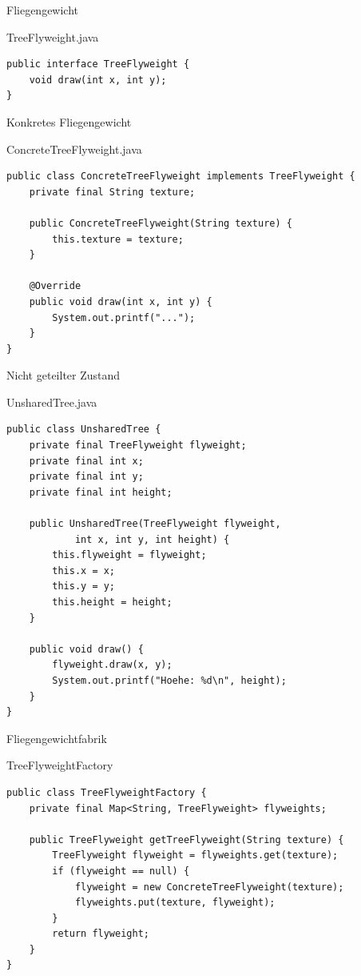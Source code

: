 \begin{frame}[fragile]{Fliegengewicht}
	\begin{exampleblock}{TreeFlyweight.java}
 		\begin{lstlisting}
public interface TreeFlyweight {
    void draw(int x, int y);
}
 		\end{lstlisting}
 	\end{exampleblock}
\end{frame}

\begin{frame}[fragile]{Konkretes Fliegengewicht}
	\begin{exampleblock}{ConcreteTreeFlyweight.java}
 		\begin{lstlisting}
public class ConcreteTreeFlyweight implements TreeFlyweight {
	private final String texture;

	public ConcreteTreeFlyweight(String texture) {
		this.texture = texture;
	}

	@Override
	public void draw(int x, int y) {
		System.out.printf("...");
	}
}
 		\end{lstlisting}
 	\end{exampleblock}
\end{frame}

\begin{frame}[fragile]{Nicht geteilter Zustand}
	\begin{exampleblock}{UnsharedTree.java}
 		\begin{lstlisting}
public class UnsharedTree {
	private final TreeFlyweight flyweight;
	private final int x;
	private final int y;
	private final int height;

	public UnsharedTree(TreeFlyweight flyweight, 
            int x, int y, int height) {
		this.flyweight = flyweight;
		this.x = x;
		this.y = y;
		this.height = height;
	}

	public void draw() {
		flyweight.draw(x, y);
		System.out.printf("Hoehe: %d\n", height);
	}
}
 		\end{lstlisting}
 	\end{exampleblock}
\end{frame}

\begin{frame}[fragile]{Fliegengewichtfabrik}
	\begin{exampleblock}{TreeFlyweightFactory}
 		\begin{lstlisting}
public class TreeFlyweightFactory {
	private final Map<String, TreeFlyweight> flyweights;

	public TreeFlyweight getTreeFlyweight(String texture) {
		TreeFlyweight flyweight = flyweights.get(texture);
		if (flyweight == null) {
			flyweight = new ConcreteTreeFlyweight(texture);
			flyweights.put(texture, flyweight);
		}
		return flyweight;
	}
} 		    
 		\end{lstlisting}
 	\end{exampleblock}
\end{frame}

